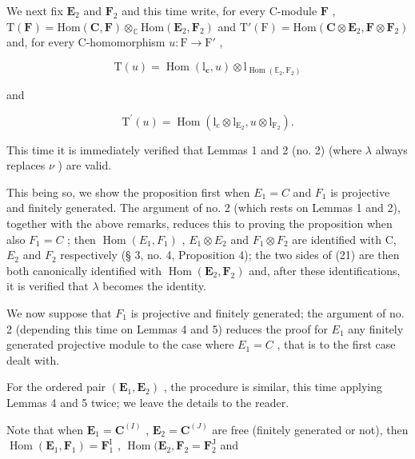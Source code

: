 We next fix \(\mathbf{E}_2\) and \(\mathbf{F}_2\) and this time write, for every C-module \(\mathbf{F}\) , \(\mathrm{T}(\mathbf{F}) = \mathrm{Hom}(\mathbf{C},\mathbf{F})\otimes_{\mathbb{C}}\mathrm{Hom}(\mathbf{E}_2,\mathbf{F}_2)\) and \(\mathrm{T}'(\mathrm{F}) = \mathrm{Hom}(\mathbf{C}\otimes \mathbf{E}_2,\mathbf{F}\otimes \mathbf{F}_2)\) and, for every C-homomorphism \(u:\mathrm{F}\to \mathrm{F}'\) ,

\[
\mathrm{T} (u) = \operatorname{Hom} (\mathrm{l} _ {\mathbf {c}}, u) \otimes \mathrm{l} _ {\operatorname{Hom} (\mathbb {E} _ {2}, \mathrm{F} _ {2})}
\]

and

\[
\mathrm{T} ^ {\prime} (u) = \operatorname{Hom} (\mathrm{l} _ {\mathrm{c}} \otimes \mathrm{l} _ {\mathrm{E} _ {2}}, u \otimes \mathrm{l} _ {\mathrm{F} _ {2}}).
\]

This time it is immediately verified that Lemmas 1 and 2 (no. 2) (where \(\lambda\) always replaces \(\nu\) ) are valid.

This being so, we show the proposition first when \(E_{1} = C\) and \(F_{1}\) is projective and finitely generated. The argument of no. 2 (which rests on Lemmas 1 and 2), together with the above remarks, reduces this to proving the proposition when also \(F_{1} = C\) ; then \(\operatorname{Hom}(E_{1}, F_{1})\) , \(E_{1} \otimes E_{2}\) and \(F_{1} \otimes F_{2}\) are identified with C, \(E_{2}\) and \(F_{2}\) respectively (§ 3, no. 4, Proposition 4); the two sides of (21) are then both canonically identified with \(\operatorname{Hom}(\mathbf{E}_{2},\mathbf{F}_{2})\) and, after these identifications, it is verified that \(\lambda\) becomes the identity.

We now suppose that \(F_{1}\) is projective and finitely generated; the argument of no. 2 (depending this time on Lemmas 4 and 5) reduces the proof for \(E_{1}\) any finitely generated projective module to the case where \(E_{1} = C\) , that is to the first case dealt with.

For the ordered pair \((\mathbf{E}_{1}, \mathbf{E}_{2})\) , the procedure is similar, this time applying Lemmas 4 and 5 twice; we leave the details to the reader.

Note that when \(\mathbf{E}_1 = \mathbf{C}^{(I)}\) , \(\mathbf{E}_2 = \mathbf{C}^{(J)}\) are free (finitely generated or not), then \(\operatorname{Hom}(\mathbf{E}_1, \mathbf{F}_1) = \mathbf{F}_1^{\mathrm{I}}\) , \(\operatorname{Hom}(\mathbf{E}_2, \mathbf{F}_2 = \mathbf{F}_2^{\mathrm{J}}\) and

